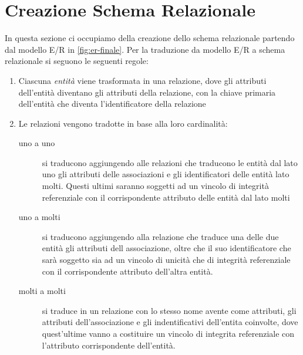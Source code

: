\section{Creazione Schema Relazionale}
In questa sezione ci occupiamo della creazione dello schema relazionale partendo dal
modello E/R in \ref{fig:er-finale}. Per la traduzione da modello E/R a schema relazionale
si seguono le seguenti regole:
\begin{enumerate}
\item Ciascuna \textit{entità} viene trasformata in una relazione,
  dove gli attributi dell'entità diventano gli attributi della
  relazione, con la chiave primaria dell'entità che diventa
  l'identificatore della relazione
\item Le relazioni vengono tradotte in base alla loro cardinalità:
\begin{description}
\item [uno a uno] si traducono aggiungendo alle relazioni che traducono le entità dal lato uno gli
    attributi delle associazioni e gli identificatori delle entità lato molti. Questi ultimi saranno soggetti
    ad un vincolo di integrità referenziale con il corrispondente attributo delle entità dal lato molti
\item [uno a molti] si traducono aggiungendo alla relazione che traduce una delle due entità gli attributi
    dell associazione, oltre che il suo identificatore che sarà soggetto sia ad un vincolo di unicità
    che di integrità referenziale con il corrispondente attributo dell’altra entità.
\item [molti a molti] si traduce in un relazione con lo stesso nome avente come attributi, gli attributi dell'associazione  
  e gli indentificativi dell'entita coinvolte, dove quest'ultime vanno a costituire un vincolo di integrita referenziale con
  l'attributo corrispondente dell'entità.
  \end{description}
\end{enumerate}

